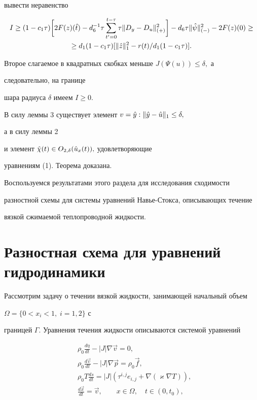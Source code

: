 вывести неравенство 


\begin{gather*} 


I\ge (1-c_1\tau)\biggl[2F(z)(\Hat t)-d_6^{-1}\tau 


\sum^{t-\tau}_{t'=0}\tau\|D_y-D_u\|^2_{(+)}\biggr] 


-d_6\tau\|\Hat\psi\|^2_{(-)}-2F(z)(0) \ge \\ 


\ge d_1(1-c_1\tau)[\|\Hat z\|^2_1 -r(t)/d_1(1-c_1\tau)]. 


\end{gather*} 


 


Второе слагаемое в квадратных скобках меньше $J(\Psi(u))\le\delta,$ а 


следовательно, на границе 


шара радиуса $\delta$ имеем $I\ge 0.$ 


В силу леммы 3 существует элемент $v=\Hat y:\|\Hat y-\Hat u\|_1\le\delta,$ 


а в силу леммы 2 


и элемент $\Hat\chi(t)\in O_{2,\delta}(\Hat u_x(t)),$ удовлетворяющие 


уравнениям (1). Теорема доказана. 


 


Воспользуемся результатами этого раздела для исследования сходимости 


разностной схемы для системы уравнений Навье-Стокса, описывающих течение 


вязкой сжимаемой теплопроводной жидкости. 


 


\section{Разностная схема для уравнений гидродинамики} 


 


Рассмотрим задачу о течении вязкой жидкости, занимающей начальный объем 


$\Omega=\{0<x_i<1,\;i=1,2\}$ с 


границей $\Gamma.$ Уравнения течения жидкости описываются системой уравнений 


\cite{Sed} 


\begin{align} 


&\rho_0\frac{d\eta}{dt}-|J|\nabla\Vec v=0,\\ 


&\rho_0\frac{d\Vec v}{dt}-|J|\nabla\Vec p=\rho_0\Vec f,\\ 


&\rho_0 T\frac{ds}{dt}=|J|(\tau^{i,j}e_{i,j}+\nabla(\varkappa\nabla T)),\\ 


&\frac{d\Vec x}{dt}=\Vec v, \qquad x\in \Omega,\quad t\in(0,t_0), 


\end{align} 


